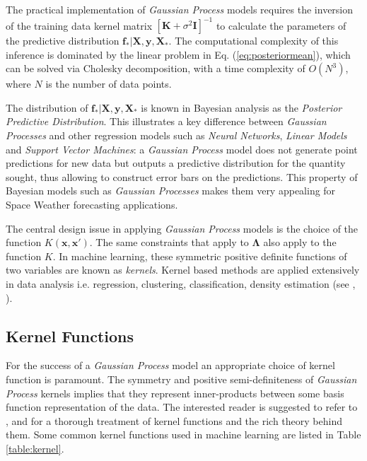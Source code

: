 The practical implementation of \emph{Gaussian Process} models requires the inversion of the training data kernel matrix $[\mathbf{K} + \sigma^{2} \mathbf{I}]^{-1}$ to calculate the parameters of the predictive distribution $\mathbf{f_*}|\mathbf{X},\mathbf{y},\mathbf{X_*}$. The computational complexity of this inference is dominated by the linear problem in Eq. (\ref{eq:posteriormean}), which can be solved via Cholesky decomposition, with a time complexity of $O(N^3)$, where $N$ is the number of data points.

The distribution of $\mathbf{f_*}| \mathbf{X},\mathbf{y},\mathbf{X_*}$ is known in Bayesian analysis as the \emph{Posterior Predictive Distribution}. This illustrates a key difference between \emph{Gaussian Processes} and other regression models such as \emph{Neural Networks}, \emph{Linear Models} and \emph{Support Vector Machines}: a \emph{Gaussian Process} model does not generate point predictions for new data but outputs a predictive distribution for the quantity sought, thus allowing to construct error bars on the predictions. This property of Bayesian models such as \emph{Gaussian Processes} makes them very appealing for Space Weather forecasting applications. 

The central design issue in applying \emph{Gaussian Process} models is the choice of the function $K(\mathbf{x}, \mathbf{x}')$. The same constraints that apply to $\mathbf{\Lambda}$ also apply to the function $K$. In machine learning, these symmetric positive definite functions of two variables are known as \emph{kernels}. Kernel based methods are applied extensively in data analysis i.e. regression, clustering, classification, density estimation (see \cite{Scholkopf:2001:LKS:559923}, \cite{hofmann2008}).

\subsection{Kernel Functions}

For the success of a \emph{Gaussian Process} model an appropriate choice of kernel function is paramount. The symmetry and positive semi-definiteness of \emph{Gaussian Process} kernels implies that they represent inner-products between some basis function representation of the data. The interested reader is suggested to refer to \cite{Berlinet2004}, \cite{Scholkopf:2001:LKS:559923} and \cite{hofmann2008} for a thorough treatment of kernel functions and the rich theory behind them. Some common kernel functions used in machine learning are listed in Table \ref{table:kernel}. 

